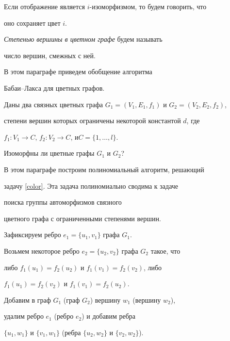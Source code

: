 Если отображение является $i$-изоморфизмом, то будем говорить, что


оно сохраняет цвет $i$.





{\it Степенью вершины в цветном графе} будем называть


число вершин, смежных с ней.





В этом параграфе приведем обобщение алгоритма


Бабаи--Лакса для цветных графов.





\begin{probs}


Даны два связных цветных графа $G_1=(V_1, E_1, f_1)$ и $G_2=(V_2, E_2, f_2)$,


степени вершин которых ограничены некоторой константой $d$, где


$f_1:V_1\to C$, $f_2:V_2\to C$, и\linebreak $C=\{1, \dotsc, l\}$.


Изоморфны ли цветные графы $G_1$ и $G_2$?


\label{color}


\end{probs}





В этом параграфе построим полиномиальный алгоритм, решающий


задачу \ref{color}. Эта задача полиномиально сводима к задаче


поиска группы автоморфизмов связного


цветного графа с ограниченными степенями вершин.


Зафиксируем ребро $e_1=\{u_1, v_1\}$ графа $G_1$.


Возьмем некоторое ребро $e_2=\{u_2, v_2\}$ графа $G_2$ такое, что


либо $f_1(u_1)=f_2(u_2)$ и $f_1(v_1)=f_2(v_2)$, либо


$f_1(u_1)=f_2(v_2)$ и $f_1(v_1)=f_2(u_2)$.


Добавим в граф $G_1$ (граф $G_2$) вершину $w_1$ (вершину $w_2$),


удалим ребро $e_1$ (ребро $e_2$) и добавим ребра


$\{u_1, w_1\}$ и $\{v_1, w_1\}$ (ребра $\{u_2, w_2\}$ и $\{v_2, w_2\}$).


